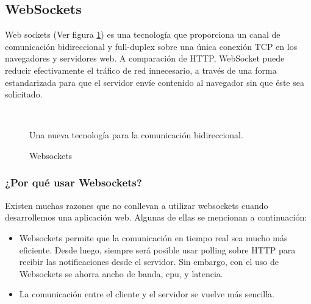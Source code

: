 \subsection{WebSockets}
Web sockets (Ver figura \ref{fig:websockets}) es una tecnología que proporciona un canal de comunicación bidireccional y full-duplex sobre una única conexión TCP en los navegadores y servidores web. A comparación de HTTP, WebSocket puede reducir efectivamente el tráfico de red innecesario, a través de una forma estandarizada para que el servidor envíe contenido al navegador sin que éste sea solicitado.\cite{cheng_new_2013}\\

\begin{figure}[h]
  \centering
  \\
  \caption{Websockets}{Una nueva tecnología para la comunicación bidireccional.}\label{fig:websockets}
\end{figure}

\subsubsection{¿Por qué usar Websockets?}

Existen muchas razones que no conllevan a utilizar websockets cuando desarrollemos una aplicación web. Algunas de ellas se mencionan a continuación:

\begin{itemize}
  \item Websockets permite que la comunicación en tiempo real sea mucho más eficiente. Desde luego, siempre será posible usar polling sobre HTTP para recibir las notificaciones desde el servidor. Sin embargo, con el uso de Websockets se ahorra ancho de banda, cpu, y latencia.
  \item La comunicación entre el cliente y el servidor se vuelve más sencilla.
\end{itemize}

